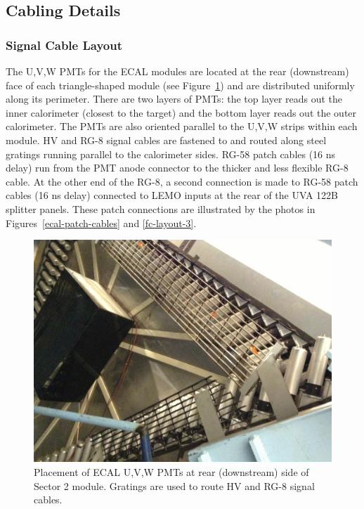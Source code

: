 \documentclass[letterpaper,10pt]{article}
\begin{document}
\subsection{Cabling Details}

\subsubsection{Signal Cable Layout}
\label{signal-conn}

The U,V,W PMTs for the ECAL modules are located at the rear (downstream) face of each triangle-shaped module
(see Figure~\ref{ecal-pmts}) and are distributed uniformly along its perimeter.  There are two layers of
PMTs: the top layer reads out the inner calorimeter (closest to the target) and the bottom layer reads out
the outer calorimeter. The PMTs are also oriented
parallel to the U,V,W strips within each module.  HV and RG-8 signal cables are fastened to and routed along steel gratings
running parallel to the calorimeter sides.  RG-58 patch cables (16 ns delay) run from the PMT anode connector
to the thicker and less flexible RG-8 cable.  At the other end of the RG-8, a second connection is made to
RG-58 patch cables (16 ns delay) connected to LEMO inputs at the rear of the UVA 122B splitter panels.  These
patch connections are illustrated by the photos in Figures~\ref{ecal-patch-cables} and \ref{fc-layout-3}.

\begin{figure}[htbp]
  \centering
  \includegraphics[width= 5in, keepaspectratio = true]{ecal-pmts.jpg}
  \vspace{2mm}
  \caption{Placement of ECAL U,V,W PMTs at rear (downstream) side of Sector 2 module.  Gratings are
  used to route HV and RG-8 signal cables.}
\label{ecal-pmts}
\end{figure}
\end{document}
